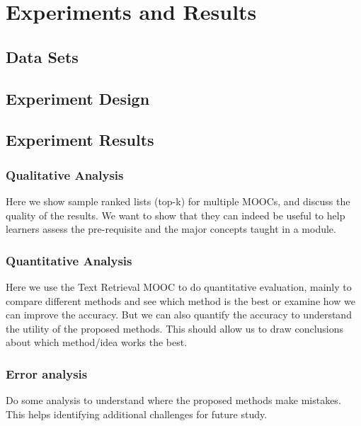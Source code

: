 \section{Experiments and Results}

\subsection{Data Sets}
\subsection{Experiment Design}

\subsection{Experiment Results}

\subsubsection{Qualitative Analysis}

Here we show sample ranked lists (top-k) for multiple MOOCs, and discuss the quality of the results. We want to show that they can indeed be useful to help learners assess the pre-requisite and the major concepts taught in a module. 

\subsubsection{Quantitative Analysis}

Here we use the Text Retrieval MOOC to do quantitative evaluation, mainly to compare different methods and see which method is the best or examine how we can improve the accuracy. But we can also quantify the accuracy to understand the utility of the proposed methods. 
This should allow us to draw conclusions about which method/idea works the best.

\subsubsection{Error analysis}

Do some analysis to understand where the proposed methods make mistakes. This helps identifying additional challenges for future study. 
